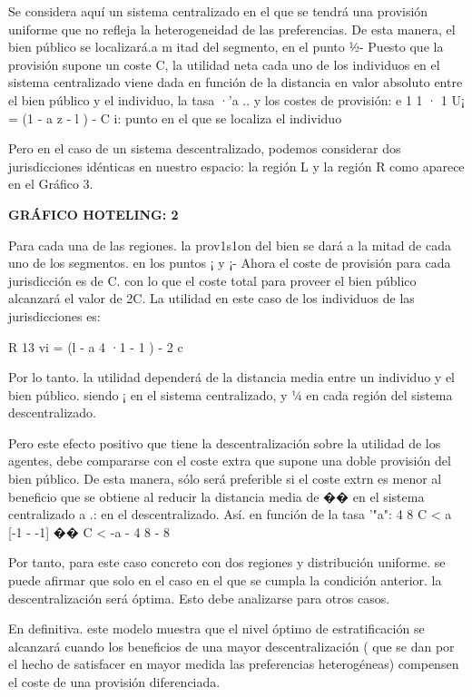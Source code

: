 \documentclass[10pt,a4paper]{article}
\begin{document}
Se considera aquí un sistema centralizado en el que se tendrá una provisión uniforme que no refleja la heterogeneidad de las preferencias. De esta manera, el bien público se localizará.a m itad del segmento, en el punto ½- Puesto que la provisión supone un coste C, la utilidad neta cada uno de los individuos en el sistema centralizado viene dada en función de la distancia en valor absoluto entre el bien público y el individuo, la tasa ·'a .. y los costes de provisión:
e
1
1
· 1
U¡ = (1 - a z - l ) - C
i: punto en el que se localiza el individuo 

Pero en el caso de un sistema descentralizado, podemos considerar dos jurisdicciones idénticas en nuestro espacio: la región L y la región R como aparece en el Gráfico 3.

\textbf{GRÁFICO HOTELING: 2}

Para cada una de las regiones. la prov1s1on del bien se dará a la mitad de cada uno de los segmentos. en los puntos ¡ y ¡- Ahora el coste de provisión para cada jurisdicción es de C. con lo que el coste total para proveer el bien público alcanzará el valor de 2C. La utilidad en este caso de los individuos de las jurisdicciones es:

R 13 vi = (l - a 4 ·1
- 1 ) - 2 c

Por lo tanto. la utilidad dependerá de la distancia media entre un individuo y el bien público. siendo ¡ en el sistema centralizado, y ¼ en cada región del sistema descentralizado. 

Pero este efecto positivo que tiene la descentralización sobre la utilidad de los agentes, debe compararse con el coste extra que supone una doble provisión del bien público. De esta manera, sólo será preferible si el coste extrn es menor al beneficio que se obtiene al reducir la distancia media de �� en el sistema centralizado a .: en el descentralizado. Así. en función de la tasa '"a":
4 8
C < a [-1 - -1] �� C < -a
- 4 8 - 8

Por tanto, para este caso concreto con dos regiones y distribución uniforme. se puede afirmar que solo en el caso en el que se cumpla la condición anterior. la descentralización será óptima. Esto debe analizarse para otros casos.

En definitiva. este modelo muestra que el nivel óptimo de estratificación se alcanzará cuando los beneficios de una mayor descentralización ( que se dan por el hecho de satisfacer en mayor medida las preferencias heterogéneas) compensen el coste de una provisión diferenciada.
\end{document}
